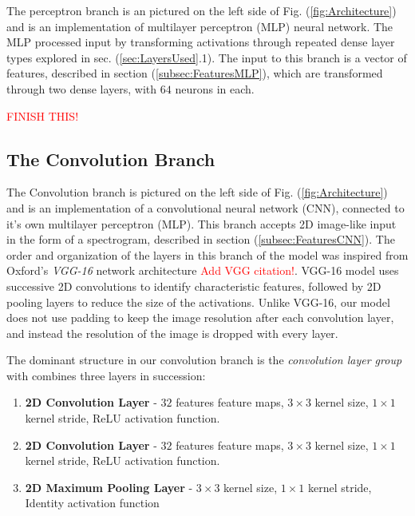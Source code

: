 \documentclass[conference,onecolumn,letterpaper]{IEEEtran}
\begin{document}
The perceptron branch is an pictured on the left side of Fig. (\ref{fig:Architecture}) and is an implementation of multilayer perceptron (MLP) neural network. The MLP processed input by transforming activations through repeated dense layer types explored in sec. (\ref{sec:LayersUsed}.1). The input to this branch is a vector of features, described in section (\ref{subsec:FeaturesMLP}), which are transformed through two dense layers, with $64$ neurons in each. 

\textcolor{red}{FINISH THIS!}




\subsection{The Convolution Branch}
\label{subsec:CNN}

The Convolution branch is pictured on the left side of Fig. (\ref{fig:Architecture}) and is an implementation of a convolutional neural network (CNN), connected to it's own multilayer perceptron (MLP). This branch accepts 2D image-like input in the form of a spectrogram, described in section (\ref{subsec:FeaturesCNN}). The order and organization of the layers in this branch of the model was inspired from Oxford's \textit{VGG-16} network architecture \cite{Geron}\textcolor{red}{Add VGG citation!}. VGG-16 model uses successive 2D convolutions to identify characteristic features, followed by 2D pooling layers to reduce the size of the activations. Unlike VGG-16, our model does not use padding to keep the image resolution after each convolution layer, and instead the resolution of the image is dropped with every layer.

The dominant structure in our convolution branch is the \textit{convolution layer group} with combines three layers in succession:
\begin{enumerate}
    \item \textbf{2D Convolution Layer} - $32$ features feature maps, $3 \times 3$ kernel size, $1 \times 1$ kernel stride, ReLU activation function.
    \item \textbf{2D Convolution Layer} - $32$ features feature maps, $3 \times 3$ kernel size, $1 \times 1$ kernel stride, ReLU activation function.
    \item \textbf{2D Maximum Pooling Layer} - $3 \times 3$ kernel size, $1 \times 1$ kernel stride, Identity activation function
\end{enumerate}
\end{document}
